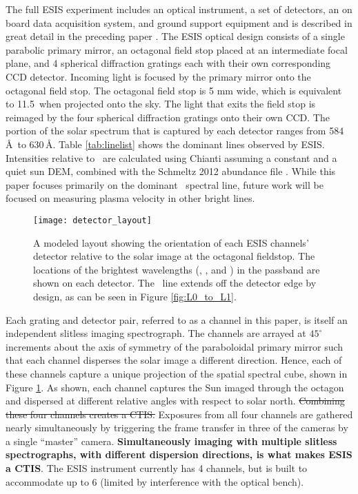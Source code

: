 	  	
    	The full ESIS experiment includes an optical instrument, a set of detectors, an on board data acquisition system, and ground support equipment and is described in great detail in the preceding paper \citep{ESIS}.
    	The ESIS optical design consists of a single parabolic primary mirror, an octagonal field stop placed at an intermediate focal plane, and 4 spherical diffraction gratings each with their own corresponding CCD detector.
    	Incoming light is focused by the primary mirror onto the octagonal field stop. 
    	The octagonal field stop is  5 mm wide, which is equivalent to %
    	11.5\arcmin \  when projected onto the sky. 
    	The light that exits the field stop is reimaged  by the four spherical diffraction gratings onto their own CCD.
    	The portion of the solar spectrum that is captured by each detector ranges from  584\,\AA \ to 630\,\AA. 
    	Table \ref{tab:linelist} shows the dominant lines observed by ESIS.
    	Intensities relative to \ov \ are calculated using Chianti \citep{ChiantiI,ChiantiX} assuming a constant and a quiet sun DEM, combined with the Schmeltz 2012 abundance file \citep{schmelz2012}.
  		While this paper focuses primarily on the dominant \ov \ spectral line, future work will be focused on measuring plasma velocity in other bright lines.
   			
        \begin{figure}
			\begin{center}
				\texttt{[image: detector\_layout]}
				\caption{A modeled layout showing the orientation of each ESIS channels' detector relative to the solar image at the octagonal fieldstop.  The locations of the brightest wavelengths (\hei, \mgxbright, and \ov) in the passband are shown on each detector.  The \hei \ line  extends off the detector edge by design, as can be seen in Figure \ref{fig:L0_to_L1}. }
				\label{fig:level_1_array}
			\end{center}
		\end{figure}

    	Each grating and detector pair, referred to as a channel in this paper,
    	is itself an independent slitless imaging spectrograph.  
    	The channels are arrayed at $45^{\circ}$ increments about the axis of symmetry of the paraboloidal primary mirror such that each channel disperses the solar image a different direction. 
    	Hence, each of these channels capture a unique projection of the spatial spectral cube, shown in Figure \ref{fig:level_1_array}. 
    	As shown, each channel captures the Sun imaged through the octagon and dispersed at different relative angles with respect to solar north. 
    	\sout{Combining these four channels creates a CTIS.}
    	Exposures from all four channels are gathered nearly simultaneously by triggering the frame transfer in three of the cameras by a single ``master'' camera. 
    	\textbf{Simultaneously imaging with multiple slitless spectrographs, with different dispersion directions, is what makes ESIS a CTIS}. 
    	The ESIS instrument currently has 4 channels, but is built to accommodate up to 6 (limited by interference with the optical bench).

